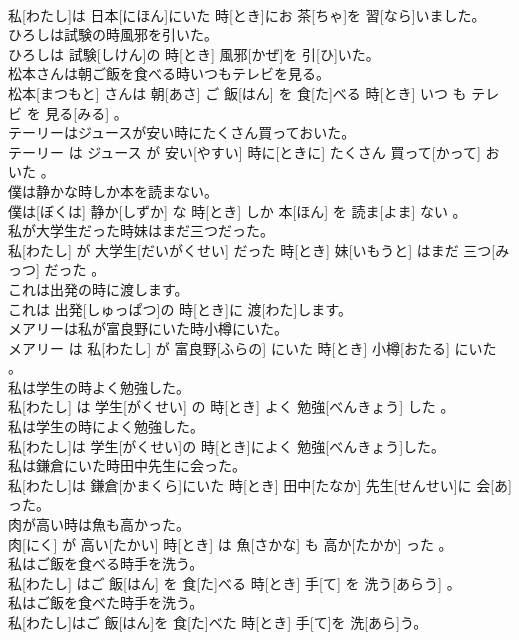 \documentclass[8pt]{extreport}
\begin{document}
\begin{CJK}{UTF8}{min}
\\	私[わたし]は 日本[にほん]にいた 時[とき]にお 茶[ちゃ]を 習[なら]いました。
\\	ひろしは試験の時風邪を引いた。	
\\	ひろしは 試験[しけん]の 時[とき] 風邪[かぜ]を 引[ひ]いた。
\\	松本さんは朝ご飯を食べる時いつもテレビを見る。	
\\	松本[まつもと] さんは 朝[あさ] ご 飯[はん] を 食[た]べる 時[とき] いつ も テレビ を 見る[みる] 。
\\	テーリーはジュースが安い時にたくさん買っておいた。	
\\	テーリー は ジュース が 安い[やすい] 時に[ときに] たくさん 買って[かって] おいた 。
\\	僕は静かな時しか本を読まない。	
\\	僕は[ぼくは] 静か[しずか] な 時[とき] しか 本[ほん] を 読ま[よま] ない 。
\\	私が大学生だった時妹はまだ三つだった。	
\\	私[わたし] が 大学生[だいがくせい] だった 時[とき] 妹[いもうと] はまだ 三つ[みっつ] だった 。
\\	これは出発の時に渡します。	
\\	これは 出発[しゅっぱつ]の 時[とき]に 渡[わた]します。
\\	メアリーは私が富良野にいた時小樽にいた。	
\\	メアリー は 私[わたし] が 富良野[ふらの] にいた 時[とき] 小樽[おたる] にいた 。
\\	私は学生の時よく勉強した。	
\\	私[わたし] は 学生[がくせい] の 時[とき] よく 勉強[べんきょう] した 。
\\	私は学生の時によく勉強した。	
\\	私[わたし]は 学生[がくせい]の 時[とき]によく 勉強[べんきょう]した。
\\	私は鎌倉にいた時田中先生に会った。	
\\	私[わたし]は 鎌倉[かまくら]にいた 時[とき] 田中[たなか] 先生[せんせい]に 会[あ]った。
\\	肉が高い時は魚も高かった。	
\\	肉[にく] が 高い[たかい] 時[とき] は 魚[さかな] も 高か[たかか] った 。
\\	私はご飯を食べる時手を洗う。	
\\	私[わたし] はご 飯[はん] を 食[た]べる 時[とき] 手[て] を 洗う[あらう] 。
\\	私はご飯を食べた時手を洗う。	
\\	私[わたし]はご 飯[はん]を 食[た]べた 時[とき] 手[て]を 洗[あら]う。

\end{CJK}
\end{document}
